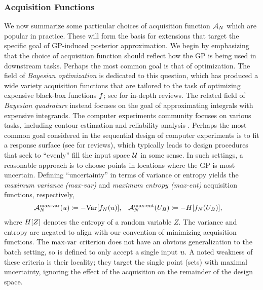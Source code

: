 \documentclass[12pt]{article}
\begin{document}
\subsubsection{Acquisition Functions}
We now summarize some particular choices of acquisition function $\acq[\Ndesign]$ which are popular in practice. These will form 
the basis for extensions that target the specific goal of GP-induced posterior approximation. We begin by emphasizing that the 
choice of acquisition function should reflect how the GP is being used in downstream tasks. Perhaps the most common goal is that 
of optimization. The field of \textit{Bayesian optimization} is dedicated to this question, which has produced a wide variety
acquisition functions that are tailored to the task of optimizing expensive black-box functions $\func$; 
see \cite{reviewBayesOpt, gramacy2020surrogates} for in-depth reviews.  
The related field of \textit{Bayesian quadrature} \cite{BayesQuadrature, BayesQuadrature, BayesQuadRatios}
instead focuses on the goal of approximating integrals with expensive integrands. The computer experiments community 
focuses on various tasks, including contour estimation and reliability analysis \cite{contourEstimation, cole2021entropybased}. 
Perhaps the most common goal considered in the sequential design of computer experiments is to fit a response surface
(see \cite{gramacy2020surrogates, SanterCompExp, design_analysis_computer_experiments} for reviews), 
which typically leads to design procedures 
that seek to ``evenly'' fill the input space $\parSpace$ in some sense.  
In such settings, a reasonable approach is to choose points in locations where the GP is most uncertain. 
Defining ``uncertainty'' in terms 
of variance or entropy yields the \textit{maximum variance (max-var)} and \textit{maximum entropy (max-ent)} acquisition functions, 
respectively, 
\begin{align}
&\labelAcq[\Ndesign]{\maxvarLabel}(\Par) \Def -\Var[\funcEm[\Ndesign](\Par)] , 
&&\labelAcq[\Ndesign]{\maxentLabel}(\designBatchIn) \Def -\Ent[\funcEm[\Ndesign](\designBatchIn)], \label{acq_max_var_ent}
\end{align} 
where $\Ent[Z]$ denotes the entropy of a random variable $Z$. The variance and entropy are negated to align with our convention 
of minimizing acquisition functions. The $\maxvarLabel$ criterion does not have an obvious generalization to the batch setting, 
so is defined to only accept a single input $\Par$. A noted weakness of these criteria is their locality; 
they target the single point (sets) with maximal uncertainty, ignoring the effect of the acquisition on the remainder of the design space. 
\end{document}
